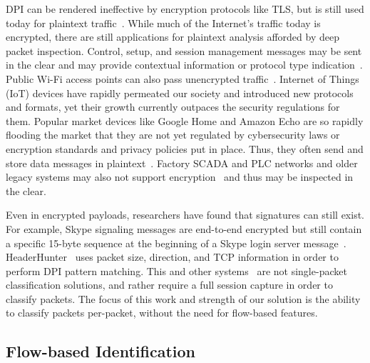 DPI can be rendered ineffective by encryption protocols like TLS, but is still used today for plaintext traffic~\cite{ZHAO202122}. While much of the Internet's traffic today is encrypted, there are still applications for plaintext analysis afforded by deep packet inspection. Control, setup, and session management messages may be sent in the clear and may provide contextual information or protocol type indication~\cite{Hasanzadeh, Ogudo, Zhang}. Public Wi-Fi access points can also pass unencrypted traffic~\cite{Maimon}. Internet of Things (IoT) devices have rapidly permeated our society and introduced new protocols and formats, yet their growth currently outpaces the security regulations for them. Popular market devices like Google Home and Amazon Echo are so rapidly flooding the market that they are not yet regulated by cybersecurity laws or encryption standards and privacy policies put in place. Thus, they often send and store data messages in plaintext~\cite{wood2017cleartext, Capellupo, WangYong}. Factory SCADA and PLC networks and older legacy systems may also not support encryption~\cite{Malaka} and thus may be inspected in the clear.

Even in encrypted payloads, researchers have found that signatures can still exist. For example, Skype signaling messages are end-to-end encrypted but still contain a specific 15-byte sequence at the beginning of a Skype login server message~\cite{Bernaille}. HeaderHunter~\cite{HeaderHunter} uses packet size, direction, and TCP information in order to perform DPI pattern matching. This and other systems~\cite{Moore2013DiscriminatorsFU, Roughan} are not single-packet classification solutions, and rather require a full session capture in order to classify packets. The focus of this work and strength of our solution is the ability to classify packets per-packet, without the need for flow-based features.

\subsection{Flow-based Identification}

